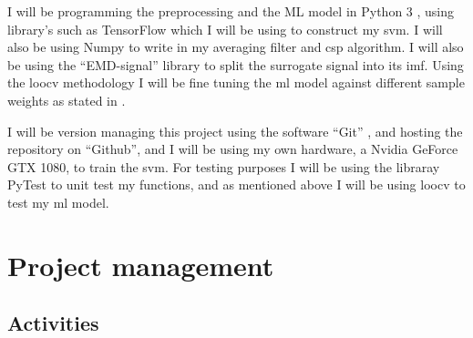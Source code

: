 \documentclass[12pt]{article}
\begin{document}
I will be programming the preprocessing and the ML model in Python 3 \cite{python3}, using library's such as TensorFlow \cite{tensorflow2015-whitepaper} which I will be using to construct my \acrshort{svm}. I will also be using Numpy \cite{harris2020array} to write in my averaging filter and \acrshort{csp} algorithm. I will also be using the ``EMD-signal'' library \cite{pyemd} to split the surrogate signal into its \acrshort{imf}. Using the \acrfull{loocv} methodology I will be fine tuning the \acrshort{ml} model against different sample weights as stated in \cite{gao2022general}. 

I will be version managing this project using the software ``Git'' , and hosting the repository on ``Github'', and I will be using my own hardware, a Nvidia GeForce GTX 1080, to train the \acrshort{svm}. For testing purposes I will be using the libraray PyTest to unit test my functions, and as mentioned above I will be using \acrshort{loocv} to test my \acrshort{ml} model.

\section{Project management}
\subsection{Activities}
\end{document}
